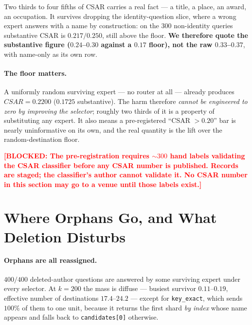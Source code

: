 \documentclass[11pt]{article}
\newcommand{\blocked}[1]{\textcolor{red}{\textbf{[BLOCKED: #1]}}}
\newcommand{\csar}{CSAR}
\begin{document}
Two thirds to four fifths of \csar{} carries a real fact --- a title, a place, an award, an
occupation. It survives dropping the identity-question slice, where a wrong expert answers with a
name by construction: on the 300 non-identity queries substantive \csar{} is $0.217/0.250$, still
above the floor. \textbf{We therefore quote the substantive figure ($0.24$--$0.30$ against a $0.17$
floor), not the raw $0.33$--$0.37$}, with name-only as its own row.

\paragraph{The floor matters.} A uniformly random surviving expert --- no router at all --- already
produces $\csar{} = 0.2200$ ($0.1725$ substantive). The harm therefore \emph{cannot be engineered to
zero by improving the selector}; roughly two thirds of it is a property of substituting any expert.
It also means a pre-registered ``\csar{} $> 0.20$'' bar is nearly uninformative on its own, and the
real quantity is the lift over the random-destination floor.

\blocked{The pre-registration requires ${\sim}300$ hand labels validating the \csar{} classifier
before any \csar{} number is published. Records are staged; the classifier's author cannot validate
it. No \csar{} number in this section may go to a venue until those labels exist.}

\section{Where Orphans Go, and What Deletion Disturbs}
\label{sec:destinations}

\paragraph{Orphans are all reassigned.} $400/400$ deleted-author questions are answered by some
surviving expert under every selector. At $k=200$ the mass is diffuse --- busiest survivor
$0.11$--$0.19$, effective number of destinations $17.4$--$24.2$ --- except for \texttt{key\_exact},
which sends $100\%$ of them to one unit, because it returns the first shard \emph{by index} whose
name appears and falls back to \texttt{candidates[0]} otherwise.
\end{document}

